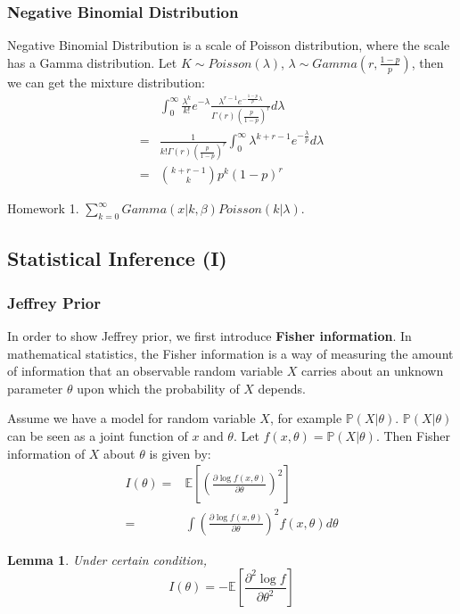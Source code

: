 \documentclass[11pt]{article}
\def\BP{{\bf P}}
\def\BP{{\mathbb P}}
\def\BE{{\mathbb E}}
\newtheorem{lemma}{Lemma}[section]
\begin{document}
\subsubsection{Negative Binomial Distribution}
Negative Binomial Distribution is a scale of Poisson distribution, where the scale has a Gamma distribution.
Let $K \sim Poisson(\lambda)$, $\lambda \sim Gamma(r, \frac{1-p}{p})$, then we can get the mixture distribution:
\[\begin{split}
&  \int_0^\infty \frac{\lambda^k}{k!} e^{-\lambda}
\frac{\lambda^{r-1} e^{-\frac{1-p}{p} \lambda}}{\Gamma(r) (\frac{p}{1-p})^r} d\lambda \\
= & \frac{1}{k! \Gamma(r) (\frac{p}{1-p})^r}  \int_0^\infty  \lambda^{k+r-1}  e^{-\frac{\lambda}{p}} d\lambda \\
 = & {k+r-1 \choose k} p^k (1-p)^r
\end{split}\]

Homework 1.   $\sum\limits_{k=0}^\infty Gamma(x | k, \beta) Poisson (k | \lambda)$.

\subsection{Statistical Inference (I)}

\subsubsection{Jeffrey Prior}
In order to show Jeffrey prior, we first introduce \textbf{Fisher information}. In mathematical statistics, the Fisher information is a way of measuring the amount of information that an observable random variable $X$ carries about an unknown parameter $\theta$ upon which the probability of $X$ depends.

Assume we have a model for random variable $X$, for example $\BP(X| \theta)$. $\BP(X | \theta)$ can be seen as a joint function of $x$ and $\theta$. Let $f(x, \theta) = \BP(X| \theta)$. Then Fisher information of $X$ about $\theta$ is given by:
\[\begin{split} I(\theta)  = &  \BE [(\frac{\partial \log f(x, \theta)}{\partial \theta})^2] \\
 = & \int \left( \frac{\partial \log f(x, \theta)}{\partial \theta} \right)^2 f(x,\theta) d\theta
\end{split}\]

\begin{lemma}
  Under certain condition, \[ I(\theta) = -\BE[\frac{\partial^2 \log f}{\partial \theta^2}]\]
\end{lemma}
\end{document}
